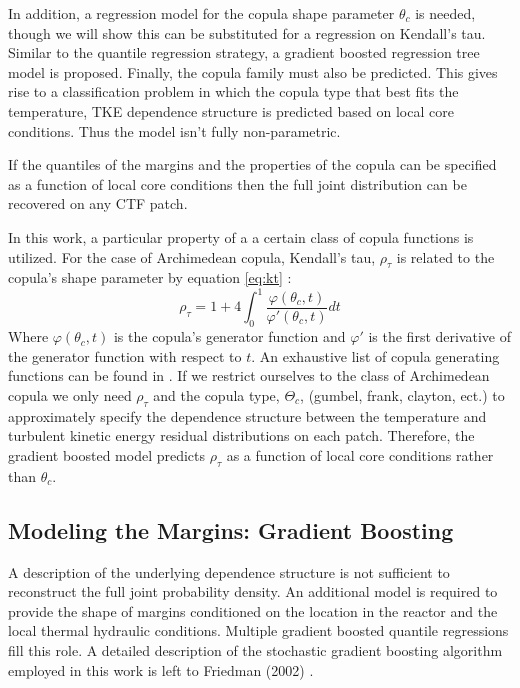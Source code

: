 In addition, a regression model for the copula shape parameter $\theta_c$ is needed, though we will show this can be substituted for a regression on Kendall's tau.  Similar to the quantile regression strategy, a gradient boosted regression tree model is proposed.  Finally, the copula family must also be predicted.  This gives rise to a classification problem in which the copula type that best fits the temperature, TKE dependence structure is predicted based on local core conditions.  Thus the model isn't fully non-parametric.

If the quantiles of the margins and the properties of the copula can be specified as a function of local core conditions then the full joint distribution can be recovered on any CTF patch.

In this work, a particular property of a a certain class of copula functions is utilized.
For the case of Archimedean copula, Kendall's tau, $\rho_\tau$ is
related to the copula's shape parameter by equation \ref{eq:kt} \cite{Nelsen2006}:
\begin{equation}
\rho_\tau = 1 + 4 \int_0^1 \frac{\varphi(\theta_c,t)}{\varphi'(\theta_c, t)}dt
\label{eq:kt}
\end{equation}
Where $\varphi(\theta_c, t)$ is the copula's generator function and $\varphi'$ is the first derivative of the generator function with respect to $t$.  An exhaustive list of copula generating functions can be found in \cite{Nelsen2006}.
If we restrict ourselves to the class of Archimedean copula we only need $\rho_\tau$ and the copula type, $\Theta_c$, (gumbel, frank, clayton, ect.) to approximately specify the dependence structure between the temperature and turbulent kinetic energy residual distributions on each patch.  Therefore, the gradient boosted model predicts $\rho_\tau$ as a function of local core conditions rather than $\theta_c$.

\subsection{Modeling the Margins: Gradient Boosting}

A description of the underlying dependence structure is not sufficient to reconstruct the full joint probability density.  An additional model is required to provide the shape of margins conditioned on the location in the reactor and the local thermal hydraulic conditions.  Multiple gradient boosted quantile regressions fill this role.  A detailed description of the stochastic gradient boosting algorithm employed in this work is left to Friedman (2002) \cite{friedman2002}.  

